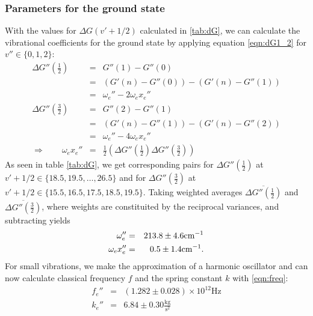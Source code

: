 \subsubsection{Parameters for the ground state}
With the values for $\Delta G(v' + 1/2)$ calculated in \ref{tab:dG}, we can calculate the vibrational coefficients for 
the ground state by applying equation \eqref{eqn:dG1_2} for $v'' \in \{0, 1, 2\}$:
\begin{eqnarray}
    \Delta G''\left ( \frac{1}{2} \right ) &=& G''(1) - G''(0) \nonumber\\
        &=& (G'(n) - G''(0)) - (G'(n) - G''(1)) \nonumber \\
        &=& \omega_e'' - 2 \omega_e x_e'' \\
    \Delta G''\left ( \frac{3}{2} \right ) &=& G''(2) - G''(1) \nonumber\\
        &=& (G'(n) - G''(1)) - (G'(n) - G''(2)) \nonumber \\
        &=& \omega_e'' - 4 \omega_e x_e'' \\
  \Rightarrow \qquad  \omega_e x_e'' &=& \frac{1}{2} \left ( \Delta G''\left ( \frac{1}{2} \right ) 
        \Delta G''\left ( \frac{3}{2} \right ) \right )
\end{eqnarray}
As seen in table \ref{tab:dG}, we get corresponding pairs for 
$\Delta G''\left ( \frac{1}{2} \right )$ at $v' + 1/2 \in \{18.5, 19.5, \ldots, 26.5\}$ 
and for 
$\Delta G''\left ( \frac{3}{2} \right )$ at $v' + 1/2 \in \{15.5, 16.5, 17.5, 18.5, 19.5\}$.
Taking weighted averages $\overline{\Delta G''\left ( \frac{1}{2} \right )}$ and 
$\overline{\Delta G''\left ( \frac{3}{2} \right )}$, 
where weights are constituited by the reciprocal variances, and subtracting yields
\begin{eqnarray}
    \omega_e'' &=& 213.8 \pm 4.6 \mathrm{cm^{-1}} \\
    \omega_e x_e'' &=& 0.5 \pm 1.4 \mathrm{cm^{-1}}.
\end{eqnarray}
For small vibrations, we make the approximation of a harmonic oscillator and 
can now calculate classical frequency $f$ and the spring constant $k$ with 
\eqref{eqn:freq}:
\begin{eqnarray}
    f_e'' &=& \left(1.282 \pm 0.028\right) \times 10^{12} \mathrm{Hz} \\
    k_e'' &=& 6.84 \pm 0.30 \mathrm{\frac{kg}{s^2}}
\end{eqnarray}

